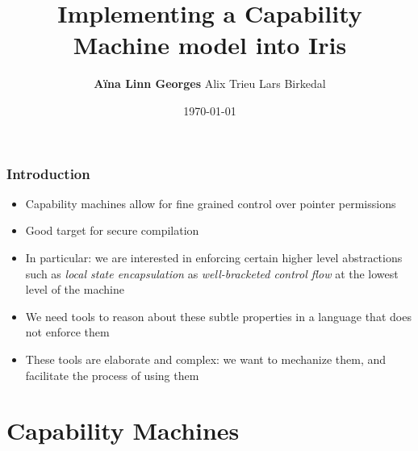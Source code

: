 \documentclass{beamer}
\title[Capability Machine in Iris]{Implementing a Capability Machine model into Iris} %
\author{\textbf{A\"{i}na Linn Georges} \hspace{1cm} Alix Trieu \hspace{1cm} Lars Birkedal} %
\institute[Aarhus University] %
{
Aarhus University \\ %
\medskip
\textit{ageorges@cs.au.dk} %
}
\date{\today} %
\begin{document}
\begin{frame}
\titlepage %
\end{frame}

\begin{frame}
\frametitle{Introduction}

\begin{itemize}
	\item<1> Capability machines allow for fine grained control over pointer permissions 
	\item<2> Good target for secure compilation
	\item<3> In particular: we are interested in enforcing certain higher level abstractions such as \textit{local state encapsulation} as \textit{well-bracketed control flow} at the lowest level of the machine
	\item<4> We need tools to reason about these subtle properties in a language that does not enforce them
	\item<5> These tools are elaborate and complex: we want to mechanize them, and facilitate the process of using them
\end{itemize}

\end{frame}



\section{Capability Machines} %
\end{document}
